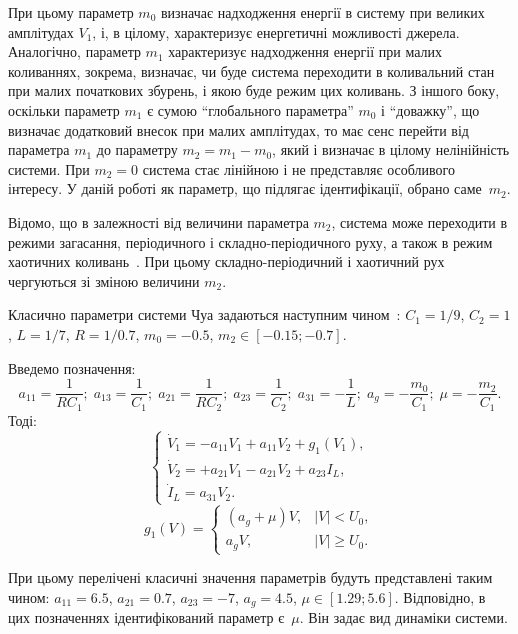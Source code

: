 При цьому параметр \(m_0\) визначає надходження енергії в
систему при великих амплітудах \(V_1\), і, в цілому, характеризує
енергетичні можливості джерела. Аналогічно, параметр \(m_1\)
характеризує надходження енергії при малих коливаннях, зокрема,
визначає, чи буде система переходити в коливальний стан при
малих початкових збурень, і якою буде режим цих коливань. З
іншого боку, оскільки параметр \(m_1\) є сумою ``глобального
параметра'' \(m_0 \) і ``доважку'', що визначає додатковий внесок
при малих амплітудах, то має сенс перейти від параметра \(m_1 \) до
параметру \(m_2 = m_1 - m_0 \), який і визначає в цілому нелінійність
системи. При \(m_2 = 0 \) система стає лінійною і не представляє
особливого інтересу.
У даній роботі як параметр, що підлягає ідентифікації, обрано саме~$m_2$.

Відомо, що в залежності від величини параметра
$ m_2 $, система може переходити в режими загасання, періодичного
і складно-періодичного руху, а також в режим хаотичних
коливань~\cite{anisch_nonlin_eff,magni_new_meth,Chua_double_scroll}. При цьому
складно-періодичний і хаотичний рух чергуються зі зміною
величини \(m_2\).


Класично параметри системи Чуа задаються наступним чином~\cite{buga_chua}:
$C_1 = 1/9$, $C_2 = 1$, $L= 1/7$, $R = 1/0.7$, $m_0=-0.5$, $ m_2 \in [ -0.15; -0.7 ] $.

Введемо позначення:
\[
  a_{11} = \frac{1}{R C_1}; \;
  a_{13} = \frac{1}{C_1}; \;
  a_{21} = \frac{1}{R C_2}; \;
  a_{23} = \frac{1}{C_2}; \;
  a_{31} = -\frac{1}{L}; \;
  a_g = - \frac{m_0}{C_1}; \;
  \mu = - \frac{m_2}{C_1}.
\]
%
Тоді:
%
\begin{equation}
\begin{cases}
  \dot{V}_1  = -a_{11} V_1 + a_{11}  V_2  + g_1(V_1) , \\
  \dot{V}_2  = +a_{21} V_1 - a_{21}  V_2  + a_{23} I_L    , \\
  \dot{I}_L  =  a_{31} V_2.
\end{cases}
\label{atu:eq:chua2}
\end{equation}
%
%
\begin{equation}
g_1(V) =
\begin{cases}
  ( a_g + \mu ) V , & |V| <   U_0, \\
  a_g V           , & |V| \ge U_0.
\end{cases}
\label{atu:eq:diodchua2}
\end{equation}

При цьому перелічені класичні значення параметрів будуть представлені таким чином:
$ a_{11} = 6.5 $, $a_{21} = 0.7$, $ a_{23} = -7 $, $ a_g = 4.5 $,
$ \mu \in [ 1.29 ; 5.6 ] $.
Відповідно, в цих позначеннях ідентифікований параметр є~$\mu$. Він задає вид динаміки системи.


